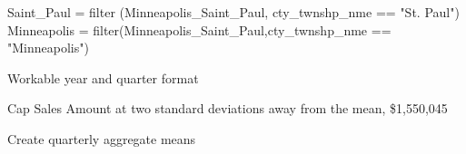 \documentclass[
]{article}
\newenvironment{Shaded}{\begin{snugshade}}{\end{snugshade}}
\newcommand{\AttributeTok}[1]{\textcolor[rgb]{0.77,0.63,0.00}{#1}}
\newcommand{\DecValTok}[1]{\textcolor[rgb]{0.00,0.00,0.81}{#1}}
\newcommand{\FunctionTok}[1]{\textcolor[rgb]{0.00,0.00,0.00}{#1}}
\newcommand{\NormalTok}[1]{#1}
\newcommand{\OtherTok}[1]{\textcolor[rgb]{0.56,0.35,0.01}{#1}}
\newcommand{\SpecialCharTok}[1]{\textcolor[rgb]{0.00,0.00,0.00}{#1}}
\newcommand{\StringTok}[1]{\textcolor[rgb]{0.31,0.60,0.02}{#1}}
\begin{document}
\begin{Shaded}
\begin{Highlighting}[]
\NormalTok{Saint\_Paul }\OtherTok{=} \FunctionTok{filter}\NormalTok{ (Minneapolis\_Saint\_Paul, cty\_twnshp\_nme }\SpecialCharTok{==} \StringTok{"St. Paul"}\NormalTok{)}
\NormalTok{Minneapolis }\OtherTok{=} \FunctionTok{filter}\NormalTok{(Minneapolis\_Saint\_Paul,cty\_twnshp\_nme }\SpecialCharTok{==} \StringTok{"Minneapolis"}\NormalTok{)}
\end{Highlighting}
\end{Shaded}

Workable year and quarter format

\begin{Shaded}
\end{Shaded}

Cap Sales Amount at two standard deviations away from the mean,
\$1,550,045

\begin{Shaded}
\end{Shaded}

Create quarterly aggregate means
\end{document}
